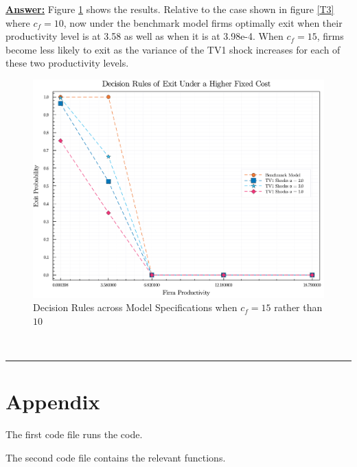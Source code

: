 \documentclass{article} %
\theoremstyle{definition}
\newenvironment{solution}[1][Answer]{\begin{singlespace}\underline{\textbf{#1:}}\quad }{\ \rule{0.3em}{0.3em}\end{singlespace}} %
\begin{document}
\begin{solution}
Figure \ref{T4} shows the results. Relative to the case shown in figure \ref{T3} where $c_{f}=10$, now under the benchmark model firms optimally exit when their productivity level is at 3.58 as well as when it is at 3.98e-4. When $c_{f}=15$, firms become less likely to exit as the variance of the TV1 shock increases for each of these two productivity levels.
\begin{figure}[htbp]
	\begin{center}
	\includegraphics[scale=.35]{Figures/decision_rules_cf15.pdf}
	\caption{Decision Rules across Model Specifications when $c_{f}=15$ rather than $10$}
	\label{T4}
	\end{center}
\end{figure}
\end{solution}

\newpage
	\section*{Appendix}
 	The first code file runs the code.
	
 	The second code file contains the relevant functions.
\end{document}

